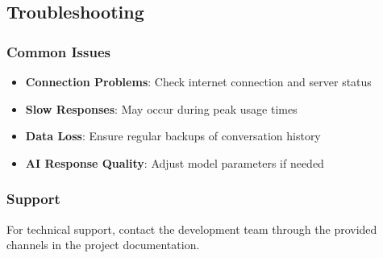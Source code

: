 \subsection{Troubleshooting}

\subsubsection{Common Issues}

\begin{itemize}
    \item \textbf{Connection Problems}: Check internet connection and server status
    \item \textbf{Slow Responses}: May occur during peak usage times
    \item \textbf{Data Loss}: Ensure regular backups of conversation history
    \item \textbf{AI Response Quality}: Adjust model parameters if needed
\end{itemize}

\subsubsection{Support}

For technical support, contact the development team through the provided channels in the project documentation. 